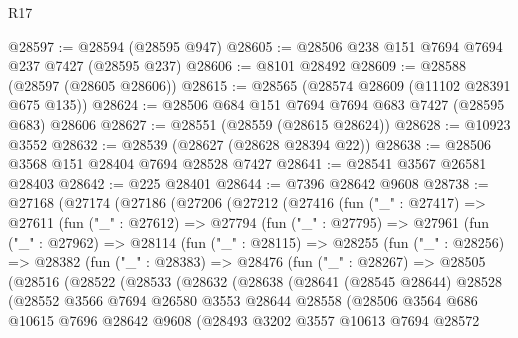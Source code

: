 \begin{lexlean}{R17}
\begin{coremodule}
@28597 := @28594 (@28595 @947)
@28605 := @28506 @238 @151 @7694 @7694 @237 @7427 (@28595 @237)
@28606 := @8101 @28492
@28609 := @28588 (@28597 (@28605 @28606))
@28615 := @28565 (@28574 @28609 (@11102 @28391 @675 @135))
@28624 := @28506 @684 @151 @7694 @7694 @683 @7427 (@28595 @683) @28606
@28627 := @28551 (@28559 (@28615 @28624))
@28628 := @10923 @3552
@28632 := @28539 (@28627 (@28628 @28394 @22))
@28638 := @28506 @3568 @151 @28404 @7694 @28528 @7427
@28641 := @28541 @3567 @26581 @28403
@28642 := @225 @28401
@28644 := @7396 @28642 @9608
@28738 := @27168
    (@27174
      (@27186
        (@27206
          (@27212
            (@27416
              (fun ("_" : @27417) =>
              @27611
                (fun ("_" : @27612) =>
                @27794
                  (fun ("_" : @27795) =>
                  @27961
                    (fun ("_" : @27962) =>
                    @28114
                      (fun ("_" : @28115) =>
                      @28255
                        (fun ("_" : @28256) =>
                        @28382
                          (fun ("_" : @28383) =>
                          @28476
                            (fun ("_" : @28267) =>
                            @28505
                              (@28516
                                (@28522
                                  (@28533
                                    (@28632
                                      (@28638
                                        (@28641
                                          (@28545 @28644)
                                          @28528
                                          (@28552
                                            @3566
                                            @7694
                                            @26580
                                            @3553
                                            @28644
                                            @28558
                                            (@28506
                                              @3564
                                              @686
                                              @10615
                                              @7696
                                              @28642
                                              @9608
                                              (@28493
                                                @3202
                                                @3557
                                                @10613
                                                @7694
                                                @28572

\end{coremodule}
\end{lexlean}
